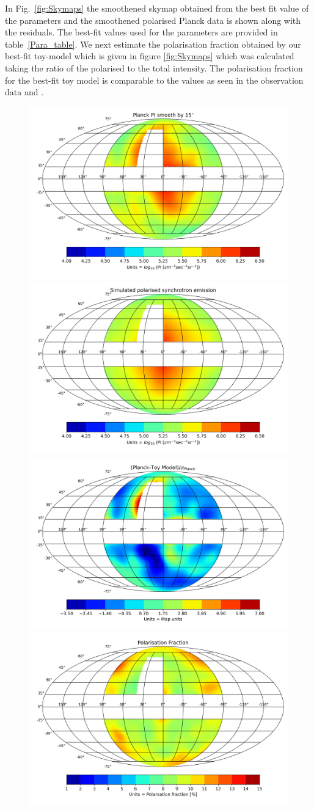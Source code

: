 \documentclass[12pt, a4 paper]{mnras}
\begin{document}
In Fig.~\ref{fig:Skymaps} the smoothened skymap obtained from the best fit value of the parameters and the smoothened polarised Planck data is shown along with the residuals. The best-fit values used for the parameters are provided in table~\ref{Para_table}. 
We next estimate the polarisation fraction obtained by our best-fit toy-model which is given in figure \ref{fig:Skymaps} which was calculated taking the ratio of the polarised to the total intensity. The polarisation fraction for the best-fit toy model is comparable to the values as seen in the observation data \cite{Carretti_2013} and \cite{WMAP_Page}.


\begin{figure}
\centering
\includegraphics[width =0.49\linewidth]{Images/Jan-17-2022_Planck_Sky_Map.png}%
\includegraphics[width=0.49\linewidth]{Images/Jan-20-2022Ver1_Skymap_Bstr_3_Btur_6_Rmag_5_Zmag_7_norm_3.76e-13.png}
\includegraphics[width = 0.49\linewidth]{Images/Jan-20-2022_Residue_Bstr_3_Btur_6_Rmag_5_Zmag_7_norm_3.76e-13.png}%
\includegraphics[width =0.49\linewidth]{Images/Jan-20-2022_Pol_Frac_30GHz_Total_Skymap_Bstr_3_Btur_6_Rmag_5_Zmag_7_norm_-1.24e+01.png}

\end{figure}
\end{document}
